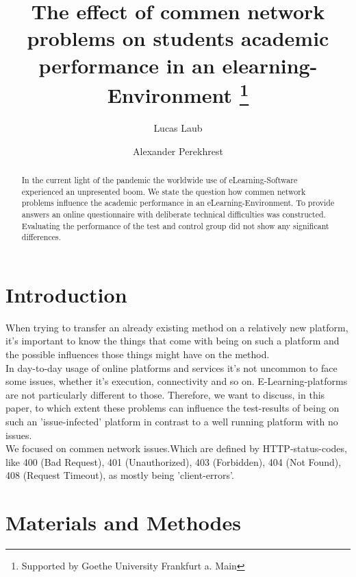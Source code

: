\documentclass[runningheads]{llncs}
\begin{document}
\title{The effect of commen network problems on students academic performance in an elearning-Environment
\thanks{Supported by Goethe University Frankfurt a. Main}}

\author{Lucas Laub \and
Alexander Perekhrest }


\maketitle


\begin{abstract}
In the current light of the pandemic the worldwide use
of eLearning-Software experienced an unpresented boom.
We state the question how commen network problems influence
the academic performance in an eLearning-Environment.
To provide answers an online questionnaire with deliberate
technical difficulties was constructed. Evaluating the performance
of the test and control group did not show any significant
differences.
\end{abstract}

\section{Introduction}
When trying to transfer an already existing method on a relatively new platform, 
it's important to know the things that come with being on such a platform and the 
possible influences those things might have on the method.\\

In day-to-day usage of online platforms and services it's not uncommon to face some 
issues, whether it's execution, connectivity and so on. E-Learning-platforms are not 
particularly different to those. Therefore, we want to discuss, in this paper, to 
which extent these problems can influence the test-results of being on such an 
'issue-infected' platform in contrast to a well running platform with no issues.\\

We focused on commen network issues.Which are defined by HTTP-status-codes, like 400 (Bad Request), 401 
(Unauthorized), 403 (Forbidden), 404 (Not Found), 408 (Request Timeout), as mostly being 'client-errors'.
\section{Materials and Methodes}
\end{document}
